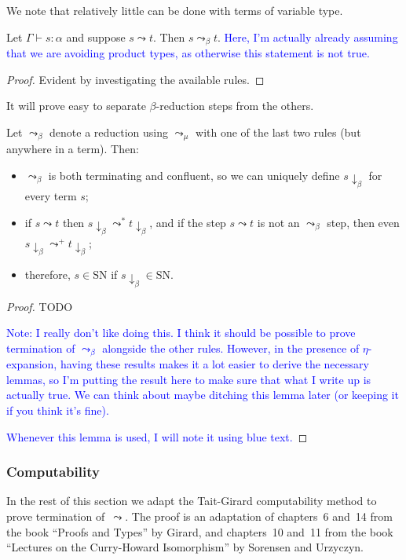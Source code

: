 \documentclass[runningheads,a4paper]{llncs}
\newcommand{\arrbeta}{\leadsto_\beta}
\newcommand{\arrnormalise}{\leadsto}
\newcommand{\normstep}{\leadsto_\mu}
\newcommand{\betanormal}[1]{#1\downarrow_\beta}
\newcommand{\SN}{\mathrm{SN}}
\newcommand{\proves}{\vdash}
\newcommand{\CK}[1]{\textcolor{blue}{#1}}
\begin{document}
We note that relatively little can be done with terms of variable type.

\begin{lemma}\label{lem_typevar_reduce}
Let $\Gamma \proves s : \alpha$ and suppose $s \arrnormalise t$.
Then $s \arrbeta t$.
\CK{Here, I'm actually already assuming that we are avoiding product
types, as otherwise this statement is not true.}
\end{lemma}

\begin{proof}
Evident by investigating the available rules.
\end{proof}

It will prove easy to separate $\beta$-reduction steps from the others.

\begin{lemma}\label{lem_beta_props}
Let $\arrbeta$ denote a reduction using $\normstep$ with one of the last
two rules (but anywhere in a term).  Then:
\begin{itemize}
\item $\arrbeta$ is both terminating and confluent, so we can uniquely
  define $\betanormal{s}$ for every term $s$;
\item if $s \arrnormalise t$ then $\betanormal{s} \arrnormalise^*
  \betanormal{t}$, and if the step $s \arrnormalise t$ is not an
  $\arrbeta$ step, then even $\betanormal{s} \arrnormalise^+
  \betanormal{t}$;
\item therefore, $s \in \SN$ if $\betanormal{s} \in \SN$.
\end{itemize}
\end{lemma}

\begin{proof}
TODO

\CK{Note: I really don't like doing this.  I think it should be possible
to prove termination of $\arrbeta$ alongside the other rules.  However,
in the presence of $\eta$-expansion, having these results makes it a lot
easier to derive the necessary lemmas, so I'm putting the result here
to make sure that what I write up is actually true.  We can think about
maybe ditching this lemma later (or keeping it if you think it's fine).}

\CK{Whenever this lemma is used, I will note it using blue text.}
\end{proof}

\subsubsection{Computability}
In the rest of this section we adapt the Tait-Girard computability
method to prove termination of~$\arrnormalise$. The proof is an
adaptation of chapters~6 and~14 from the book ``Proofs and Types'' by
Girard, and chapters~10 and~11 from the book ``Lectures on the
Curry-Howard Isomorphism'' by Sorensen and Urzyczyn.
\end{document}
